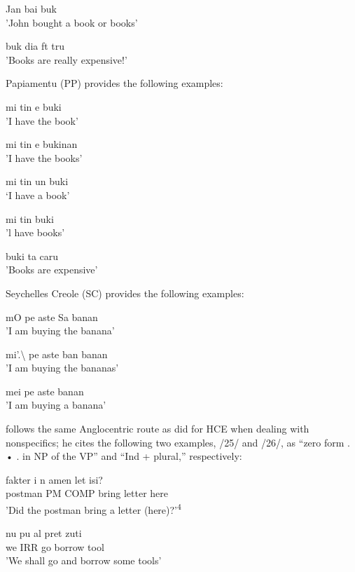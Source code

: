 \ea\label{ex:15}
Jan bai buk\\
\glt 'John bought a book or books'
\z

\ea\label{ex:16}
 buk dia ft tru\\
\glt 'Books are really expensive!'
\z



Papiamentu (PP) provides the following examples:

\ea\label{ex:17}
mi tin e buki\\
\glt 'I have the book'
\z


\ea\label{ex:18}
mi tin e bukinan \\
\glt 'I have the books'
\z

\ea\label{ex:19}
mi tin un buki\\
\glt `I have a book'
\z

\ea\label{ex:20}
mi tin buki\\
\glt  'l have books'
\z



\ea\label{ex:21}
buki ta caru \\
\glt 'Books are expensive'
\z



Seychelles Creole (SC) provides the following examples:

\ea\label{ex:22}
 mO pe aste Sa banan \\
\glt 'I am buying the banana'
\z



\ea\label{ex:23}
 mi'.{\textbackslash} pe aste ban banan \\
\glt 'I am buying the bananas'
\z



\ea\label{ex:24}
 mei pe aste banan\\
\glt 'I am buying a banana'
\z



\citet[13]{Corne1977} follows the same Anglocentric route as \citet{Perlman1973} did for HCE when dealing with nonspecifics; he cites the following two examples, /25/ and /26/, as ``zero form . • . in NP of the VP'' and ``Ind + plural,'' respectively:

\ea\label{ex:25}
\gll fakter i n amen let isi?\\
postman PM COMP bring letter here\\
\glt 'Did the postman bring a letter (here)?'\textsuperscript{4}
\z

 

\ea\label{ex:26}
 \gll nu pu al pret zuti\\
we IRR go borrow tool \\
\glt 'We shall go and borrow some tools'
\z





